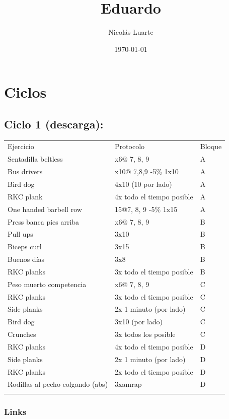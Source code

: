 \documentclass[11pt]{article}
\author{Nicolás Luarte}
\date{\today}
\title{Eduardo}
\begin{document}
\maketitle
\tableofcontents

\section{Ciclos}
\label{sec:org276ca6b}
\subsection{Ciclo 1 (descarga):}
\label{sec:org965e6c0}
\begin{center}
\begin{tabular}{lll}
Ejercicio & Protocolo & Bloque\\
Sentadilla beltless & x6@ 7, 8, 9 & A\\
Bus drivers & x10@ 7,8,9 -5\% 1x10 & A\\
Bird dog & 4x10 (10 por lado) & A\\
RKC plank & 4x todo el tiempo posible & A\\
One handed barbell row & 15@7, 8, 9 -5\% 1x15 & A\\
\hline
Press banca pies arriba & x6@ 7, 8, 9 & B\\
Pull ups & 3x10 & B\\
Biceps curl & 3x15 & B\\
Buenos días & 3x8 & B\\
RKC planks & 3x todo el tiempo posible & B\\
\hline
Peso muerto competencia & x6@ 7, 8, 9 & C\\
RKC planks & 3x todo el tiempo posible & C\\
Side planks & 2x 1 minuto (por lado) & C\\
Bird dog & 3x10 (por lado) & C\\
Crunches & 3x todos los posible & C\\
\hline
RKC planks & 4x todo el tiempo posible & D\\
Side planks & 2x 1 minuto (por lado) & D\\
RKC planks & 2x todo el tiempo posible & D\\
Rodillas al pecho colgando (abs) & 3xamrap & D\\
 &  & \\
\end{tabular}
\end{center}

\subsubsection{Links}
\label{sec:org0e6608a}
\end{document}
